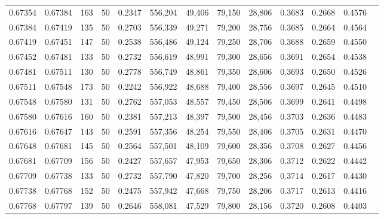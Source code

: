 \begin{tabular}{rrrrrrrrrrrrr}
0.67354 & 0.67384 &   163 &  50 &                                     0.2347 & 556,204 &  49,406 &  79,150 &  28,806 & 0.3683 & 0.2668 & 0.4576 \\
0.67384 & 0.67419 &   135 &  50 &                                     0.2703 & 556,339 &  49,271 &  79,200 &  28,756 & 0.3685 & 0.2664 & 0.4564 \\
0.67419 & 0.67451 &   147 &  50 &                                     0.2538 & 556,486 &  49,124 &  79,250 &  28,706 & 0.3688 & 0.2659 & 0.4550 \\
0.67452 & 0.67481 &   133 &  50 &                                     0.2732 & 556,619 &  48,991 &  79,300 &  28,656 & 0.3691 & 0.2654 & 0.4538 \\
0.67481 & 0.67511 &   130 &  50 &                                     0.2778 & 556,749 &  48,861 &  79,350 &  28,606 & 0.3693 & 0.2650 & 0.4526 \\
0.67511 & 0.67548 &   173 &  50 &                                     0.2242 & 556,922 &  48,688 &  79,400 &  28,556 & 0.3697 & 0.2645 & 0.4510 \\
0.67548 & 0.67580 &   131 &  50 &                                     0.2762 & 557,053 &  48,557 &  79,450 &  28,506 & 0.3699 & 0.2641 & 0.4498 \\
0.67580 & 0.67616 &   160 &  50 &                                     0.2381 & 557,213 &  48,397 &  79,500 &  28,456 & 0.3703 & 0.2636 & 0.4483 \\
0.67616 & 0.67647 &   143 &  50 &                                     0.2591 & 557,356 &  48,254 &  79,550 &  28,406 & 0.3705 & 0.2631 & 0.4470 \\
0.67648 & 0.67681 &   145 &  50 &                                     0.2564 & 557,501 &  48,109 &  79,600 &  28,356 & 0.3708 & 0.2627 & 0.4456 \\
0.67681 & 0.67709 &   156 &  50 &                                     0.2427 & 557,657 &  47,953 &  79,650 &  28,306 & 0.3712 & 0.2622 & 0.4442 \\
0.67709 & 0.67738 &   133 &  50 &                                     0.2732 & 557,790 &  47,820 &  79,700 &  28,256 & 0.3714 & 0.2617 & 0.4430 \\
0.67738 & 0.67768 &   152 &  50 &                                     0.2475 & 557,942 &  47,668 &  79,750 &  28,206 & 0.3717 & 0.2613 & 0.4416 \\
0.67768 & 0.67797 &   139 &  50 &                                     0.2646 & 558,081 &  47,529 &  79,800 &  28,156 & 0.3720 & 0.2608 & 0.4403 \\

\end{tabular}
